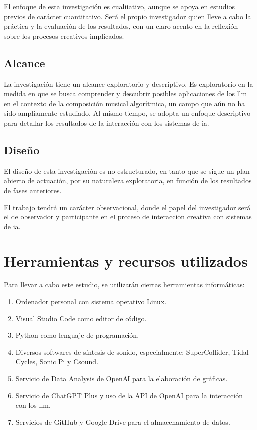 El enfoque de esta investigación es {cualitativo}, aunque se apoya en estudios previos de carácter cuantitativo. Será el propio investigador quien lleve a cabo la práctica y la evaluación de los resultados, con un claro acento en la reflexión sobre los procesos creativos implicados.

\subsection{Alcance}
La investigación tiene un alcance {exploratorio} y {descriptivo}. Es exploratorio en la medida en que se busca comprender y descubrir posibles aplicaciones de los \gls{llm} en el contexto de la composición musical algorítmica, un campo que aún no ha sido ampliamente estudiado. Al mismo tiempo, se adopta un enfoque descriptivo para detallar los resultados de la interacción con los sistemas de \gls{ia}.


\subsection{Diseño}
El diseño de esta investigación es {no estructurado}, en tanto que se sigue un plan abierto de actuación, por su naturaleza exploratoria, en función de los resultados de fases anteriores.

El trabajo tendrá un carácter {observacional}, donde el papel del investigador será el de observador y participante en el proceso de interacción creativa con sistemas de \gls{ia}.

\section{Herramientas y recursos utilizados}

Para llevar a cabo este estudio, se utilizarán ciertas herramientas informáticas:

\begin{enumerate}
    \item Ordenador personal con sistema operativo Linux.
    \item Visual Studio Code como editor de código.
    \item Python como lenguaje de programación.
    \item Diversos softwares de síntesis de sonido, especialmente: SuperCollider, Tidal Cycles, Sonic Pi y Csound.
    \item Servicio de Data Analysis de OpenAI para la elaboración de gráficas.
    \item Servicio de ChatGPT Plus y uso de la API de OpenAI para la interacción con los \gls{llm}.
    \item Servicios de GitHub y Google Drive para el almacenamiento de datos.
\end{enumerate}


